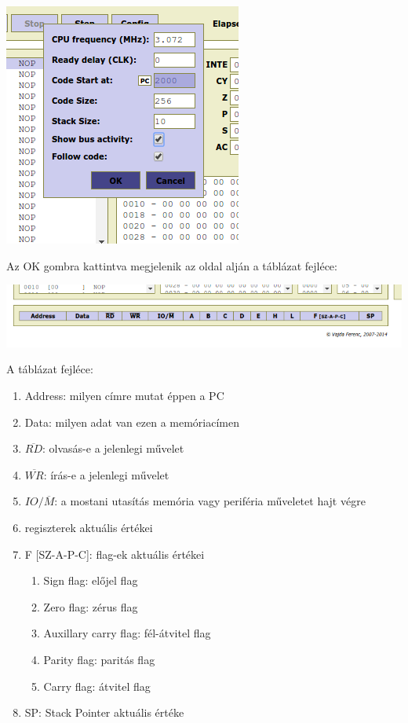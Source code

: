 \documentclass{article}
\begin{document}
\includegraphics[scale=0.5]{sim_lepes3.png}

Az OK gombra kattintva megjelenik az oldal alján a táblázat fejléce:

\includegraphics[scale=0.5]{sim_lepes4.png}

A táblázat fejléce:
\begin{enumerate}
	\item Address: milyen címre mutat éppen a PC
	\item Data: milyen adat van ezen a memóriacímen
	\item $\overline{RD}$: olvasás-e a jelenlegi művelet
	\item $\overline{WR}$: írás-e a jelenlegi művelet
	\item $IO/\overline{M}$: a mostani utasítás memória vagy periféria műveletet hajt végre
	\item regiszterek aktuális értékei
	\item F [SZ-A-P-C]: flag-ek aktuális értékei
	\begin{enumerate}
		\item Sign flag: előjel flag
		\item Zero flag: zérus flag
		\item Auxillary carry flag: fél-átvitel flag
		\item Parity flag: paritás flag
		\item Carry flag: átvitel flag
	\end{enumerate}
	\item SP: Stack Pointer aktuális értéke
\end{enumerate}
\end{document}

